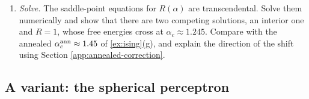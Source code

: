 \documentclass[11pt]{article}
\begin{document}
\begin{exercise}
\begin{enumerate}
    \item \emph{Solve.} The saddle-point equations for $R(\alpha)$ are transcendental. Solve them numerically and show that there are two competing solutions, an interior one and $R=1$, whose free energies cross at $\alpha_c\approx1.245$. Compare with the annealed $\alpha_c^{\rm ann}\approx1.45$ of \cref{ex:ising}(g), and explain the direction of the shift using Section \ref{app:annealed-correction}.
\end{enumerate}
\end{exercise}

\subsection{A variant: the spherical perceptron}
\label{app:sph-perceptron}
\end{document}
